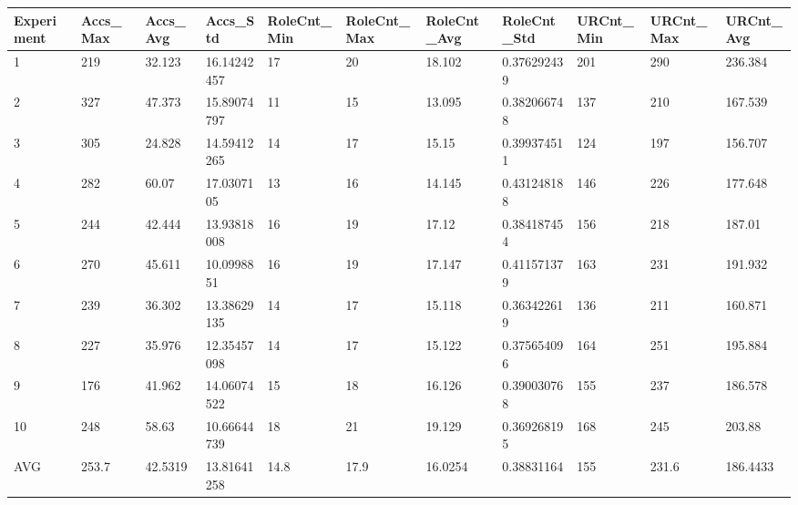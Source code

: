 \begin{table}[H]
\begin{adjustbox}{max width=380pt,keepaspectratio,angle=90}
\begin{tabular}{|l|l|l|l|l|l|l|l|l|l|l|}
				\end{tabular}
			\end{adjustbox}
			\begin{adjustbox}{max width=380pt,keepaspectratio,angle=90}
				\begin{tabular}{|l|l|l|l|l|l|l|l|l|l|l|}
					\hline
					\rowcolor[HTML]{EFEFEF} 
					Experiment & Accs\_Max & Accs\_Avg & Accs\_Std   & RoleCnt\_Min & RoleCnt\_Max & RoleCnt\_Avg & RoleCnt\_Std & URCnt\_Min & URCnt\_Max & URCnt\_Avg \\ \hline
					1          & 219       & 32.123    & 16.14242457 & 17           & 20           & 18.102       & 0.376292439  & 201        & 290        & 236.384    \\ \hline
					2          & 327       & 47.373    & 15.89074797 & 11           & 15           & 13.095       & 0.382066748  & 137        & 210        & 167.539    \\ \hline
					3          & 305       & 24.828    & 14.59412265 & 14           & 17           & 15.15        & 0.399374511  & 124        & 197        & 156.707    \\ \hline
					4          & 282       & 60.07     & 17.0307105  & 13           & 16           & 14.145       & 0.431248188  & 146        & 226        & 177.648    \\ \hline
					5          & 244       & 42.444    & 13.93818008 & 16           & 19           & 17.12        & 0.384187454  & 156        & 218        & 187.01     \\ \hline
					6          & 270       & 45.611    & 10.0998851  & 16           & 19           & 17.147       & 0.411571379  & 163        & 231        & 191.932    \\ \hline
					7          & 239       & 36.302    & 13.38629135 & 14           & 17           & 15.118       & 0.363422619  & 136        & 211        & 160.871    \\ \hline
					8          & 227       & 35.976    & 12.35457098 & 14           & 17           & 15.122       & 0.375654096  & 164        & 251        & 195.884    \\ \hline
					9          & 176       & 41.962    & 14.06074522 & 15           & 18           & 16.126       & 0.390030768  & 155        & 237        & 186.578    \\ \hline
					10         & 248       & 58.63     & 10.66644739 & 18           & 21           & 19.129       & 0.369268195  & 168        & 245        & 203.88     \\ \hline
					AVG        & 253.7     & 42.5319   & 13.81641258 & 14.8         & 17.9         & 16.0254      & 0.38831164   & 155        & 231.6      & 186.4433   \\ \hline

\end{tabular}
\end{adjustbox}
\end{table}
